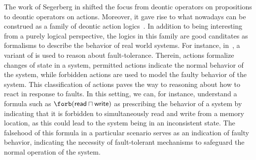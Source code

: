 The work of Segerberg in \cite{Segerberg1982} shifted the focus from deontic operators on propositions to deontic operators on actions. 
Moreover, it gave rise to what nowadays can be construed as a family of deontic action logics~\cite{Maibaum87,Segerberg1982,Meyer:1994,Castro:2009,BroersenThesis,Trypuz:2010,Trypuz15,Prisacariu:2012}.
In addition to being interesting from a purely logical perspective, the logics in this family are good canditates as formalisms to describe the behavior of real world systems.
For instance, in~\cite{Castro:2009,DemasiCRMA15}, a variant of \DAL is used to reason about fault-tolerance. 
Therein, actions formalize changes of state in a system, permitted actions indicate the normal behavior of the system, while forbidden actions are used to model the faulty behavior of the system.
This classification of actions paves the way to reasoning about how to react in response to faults.
In this setting, we can, for instance, understand a formula such as $\forb(\mathsf{read} \sqcap \mathsf{write})$ as prescribing the behavior of a system by indicating that it is forbidden to simultaneously read and write from a memory location, as this could lead to the system being in an inconsistent state.
The falsehood of this formula in a particular scenario serves as an indication of faulty behavior, indicating the necessity of fault-tolerant mechanisms to safeguard the normal operation of the system.




